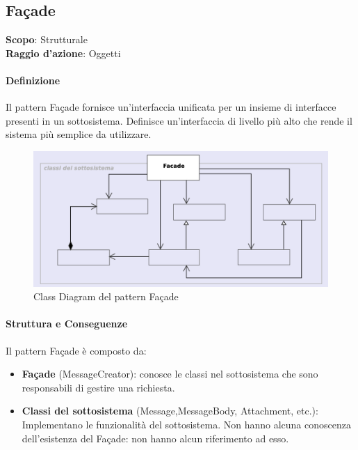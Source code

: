 \subsection{Façade}
\label{facade}

\textbf{Scopo}: Strutturale \\
\textbf{Raggio d'azione}: Oggetti

\paragraph{Definizione} Il pattern Façade fornisce un'interfaccia unificata per un insieme di interfacce presenti in un sottosistema. Definisce un'interfaccia di livello più alto che rende il sistema più semplice da utilizzare.

\begin{figure}[H]
    \centering
    \includegraphics[width=1\linewidth]{assets/pattern/facade/facade-struttura.png}
    \caption{Class Diagram del pattern Façade}
\end{figure}

\paragraph{Struttura e Conseguenze} Il pattern Façade è composto da:
\begin{itemize}
    \item \textbf{Façade} (MessageCreator): conosce le classi nel sottosistema che sono responsabili di gestire una richiesta. 
    \item \textbf{Classi del sottosistema} (Message,MessageBody, Attachment, etc.): Implementano le funzionalità del sottosistema. Non hanno alcuna conoscenza dell’esistenza del Façade: non hanno alcun riferimento ad esso.
\end{itemize}

